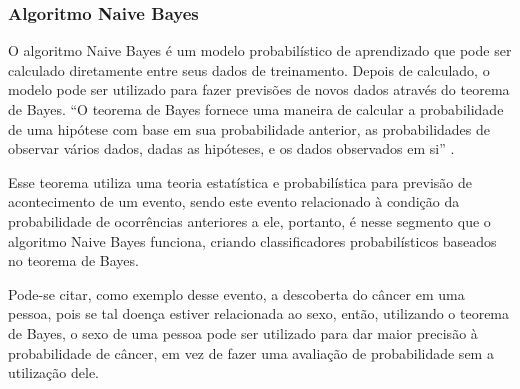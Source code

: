 % 
% 
%  
%  


\subsubsection{Algoritmo Naive Bayes}\label{cap:refTeor:sssec:nbayes}

O algoritmo Naive Bayes é um modelo probabilístico de aprendizado que pode ser calculado diretamente entre seus dados de treinamento. Depois de calculado, o modelo pode ser utilizado para fazer previsões de novos dados através do teorema de Bayes. ``O teorema de Bayes fornece uma maneira de calcular a probabilidade de uma hipótese com base em sua probabilidade anterior, as probabilidades de observar vários dados, dadas as hipóteses, e os dados observados em si'' \cite[p. 156]{Mitchell1997}.



Esse teorema utiliza uma teoria estatística e probabilística para previsão de acontecimento de um evento, sendo este evento relacionado à condição da probabilidade de ocorrências anteriores a ele, portanto, é nesse segmento que o algoritmo Naive Bayes funciona, criando classificadores probabilísticos baseados no teorema de Bayes. 


Pode-se citar, como exemplo desse evento, a descoberta do câncer em uma pessoa, pois se tal doença estiver relacionada ao sexo, então, utilizando o teorema de Bayes, o sexo de uma pessoa pode ser utilizado para dar maior precisão à probabilidade de câncer, em vez de fazer uma avaliação de probabilidade sem a utilização dele.

